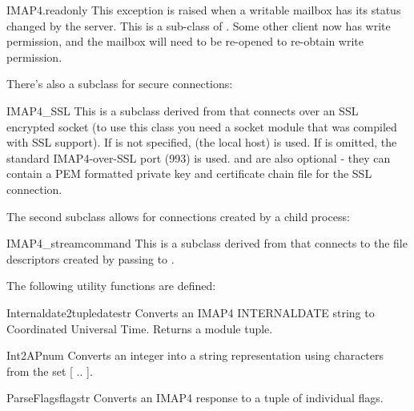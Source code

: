 \begin{excdesc}{IMAP4.readonly}
This exception is raised when a writable mailbox has its status
changed by the server.  This is a sub-class of
.  Some other client now has write permission,
and the mailbox will need to be re-opened to re-obtain write
permission.
\end{excdesc}

There's also a subclass for secure connections:

\begin{classdesc}{IMAP4_SSL}{}
This is a subclass derived from  that connects over an
SSL encrypted socket (to use this class you need a socket module that
was compiled with SSL support).  If  is not specified,
 (the local host) is used.  If  is omitted, the
standard IMAP4-over-SSL port (993) is used.   and
 are also optional - they can contain a PEM formatted
private key and certificate chain file for the SSL connection.
\end{classdesc}

The second subclass allows for connections created by a child process:

\begin{classdesc}{IMAP4_stream}{command}
This is a subclass derived from  that connects
to the  file descriptors created by passing
 to .
\end{classdesc}

The following utility functions are defined:

\begin{funcdesc}{Internaldate2tuple}{datestr}
  Converts an IMAP4 INTERNALDATE string to Coordinated Universal
  Time. Returns a  module tuple.
\end{funcdesc}

\begin{funcdesc}{Int2AP}{num}
  Converts an integer into a string representation using characters
  from the set [ .. ].
\end{funcdesc}

\begin{funcdesc}{ParseFlags}{flagstr}
  Converts an IMAP4  response to a tuple of individual
  flags.
\end{funcdesc}

